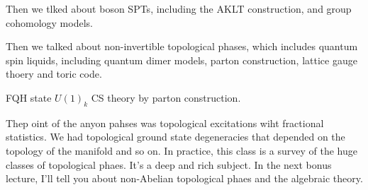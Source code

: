 Then we tlked about boson SPTs,
including the AKLT construction,
and group cohomology models.

Then we talked about non-invertible topological phases,
which includes quantum spin liquids,
including quantum dimer models,
parton construction,
lattice gauge thoery and toric code.

FQH state $U(1)_k$ CS theory by parton construction.

Thep oint of the anyon pahses was topological excitations wiht fractional
statistics.
We had topological ground state degeneracies that depended on the topology of
the manifold and so on.
In practice,
this class is a survey of the huge classes of topological phaes.
It's a deep and rich subject.
In the next bonus lecture,
I'll tell you about non-Abelian topological phaes and the algebraic theory.
